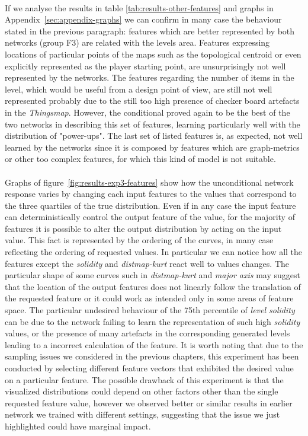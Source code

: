 \paragraph{} If we analyse the results in table \ref{tab:results-other-features} and graphs in Appendix~\ref{sec:appendix-graphs} we can confirm in many case the behaviour stated in the previous paragraph: features which are better represented by both networks (group F3) are related with the levels area. Features expressing  locations of particular points of the maps such as the topological centroid or even explicitly represented as the player starting point, are unsurprisingly not well represented by the networks. The features regarding the number of items in the level, which would be useful from a design point of view, are still not well represented probably due to the still too high presence of checker board artefacts in the \textit{Thingsmap}. However, the conditional proved again to be the best of the two networks in describing this set of features, learning particularly well with the distribution of "power-ups". The last set of listed features is, as expected, not well learned by the networks since it is composed by features which are graph-metrics or other too complex features, for which this kind of model is not suitable.

\paragraph{} Graphs of figure~\ref{fig:results-exp3-features} show how the unconditional network response varies by changing each input features to the values that correspond to the three quartiles of the true distribution. Even if in any case the input feature can deterministically control the output feature of the value, for the majority of features it is possible to alter the output distribution by acting on the input value. This fact is represented by the ordering of the curves, in many case reflecting the ordering of requested values.
In particular we can notice how all the features except the \textit{solidity} and \textit{distmap-kurt} react well to values changes. The particular shape of some curves such in \textit{distmap-kurt} and \textit{major axis} may suggest that the location of the output features does not linearly follow the translation of the requested feature or it could work as intended only in some areas of feature space. The particular undesired behaviour of the 75th percentile of \textit{level solidity} can be due to the network failing to learn the representation of such high \textit{solidity} values, or the presence of many artefacts in the corresponding generated levels leading to a incorrect calculation of the feature. 
 It is worth noting that due to the sampling issues we considered in the previous chapters, this experiment has been conducted by selecting different feature vectors that exhibited the desired value on a particular feature. The possible drawback of this experiment is that the visualized distributions could depend on other factors other than the single requested feature value, however we observed better or similar results in earlier network we trained with different settings, suggesting that the issue we just highlighted could have marginal impact.

